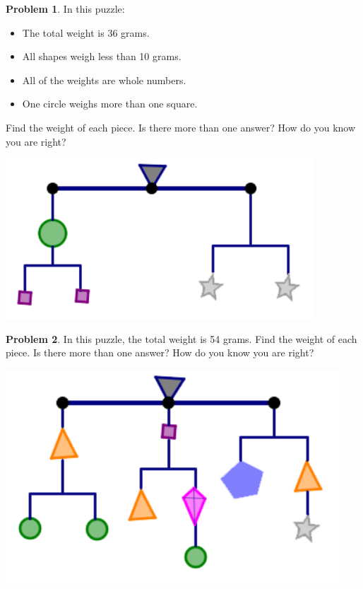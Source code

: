 \documentclass[12pt, reqno]{amsart}
\theoremstyle{remark}
\theoremstyle{definition}
\newtheorem{problem}{Problem}
\numberwithin{equation}{section}  %
\begin{document}
\begin{problem}\label{prob:mobile1}
In this puzzle:
\begin{itemize}
\item
The total weight is 36 grams. 
\item
 All shapes weigh less than 10 grams.  
 \item
 All of the weights are whole numbers.
 \item
 One circle weighs more than one square.  
 \end{itemize}
 Find the weight of each piece.  Is there more than one answer?  How do you know you are right?

\begin{center}
\includegraphics[height=6cm]{mobile1}
\end{center}
\end{problem}

\newpage

\begin{problem}\label{prob:mobile2}
In this puzzle, the total weight is 54 grams.
 Find the weight of each piece.  Is there more than one answer?  How do you know you are right?
\begin{center}
\includegraphics[height=8cm]{mobile2}
\end{center}
\end{problem}
\end{document}
